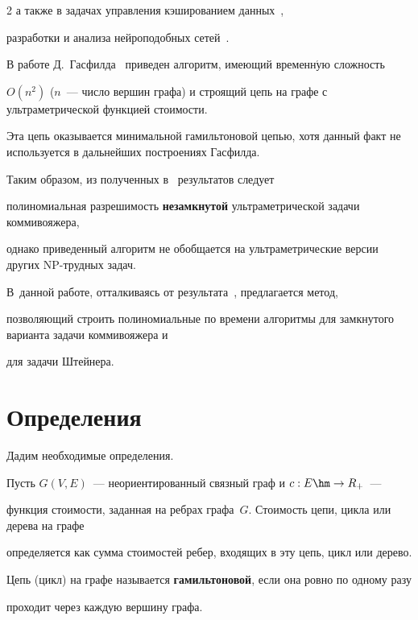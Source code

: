 \begin{multicols}{2}
а также в задачах управления кэшированием данных~\cite{Li},


разработки и анализа нейроподобных сетей~\cite{Kintsel}.





В работе Д.~Гасфилда~\cite{Gusfield} приведен алгоритм, имеющий временн$\acute{\mbox{у}}$ю сложность


$O(n^2)$ ($n$~--- чис\-ло вершин графа) и строящий цепь на графе с ульт\-ра\-мет\-рической функцией стои\-мости.


Эта цепь оказывается минимальной гамильтоновой цепью, хотя данный факт не используется в дальнейших построениях Гасфилда.


Таким образом, из полученных в~\cite{Gusfield} результатов следует


полиномиальная разрешимость \textbf{незамкнутой} ультраметрической задачи коммивояжера,


однако приведенный алгоритм не обобщается на ультраметрические версии других NP-трудных задач.





В~данной работе, отталкиваясь от результата~\cite{Gusfield}, предлагается метод,


позволяющий строить полиномиальные по времени алгоритмы для замкнутого варианта задачи коммивояжера и


для задачи Штейнера.





\section{Определения}





Дадим необходимые определения.


Пусть $G(V,E)$~--- неориентированный связный граф и $c: E\hm\rightarrow R_{+}$~---


функция стоимости, заданная на ребрах графа~$G$. Стоимость цепи, цикла или дерева на графе


определяется как сумма стоимостей ребер, входящих в эту цепь, цикл или дерево.





Цепь (цикл) на графе называется \textbf{га\-миль\-то\-но\-вой}, если она ровно по одному разу


проходит через каждую вершину графа.






\end{multicols}
